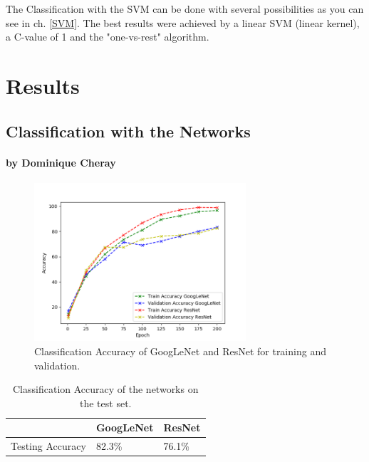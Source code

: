 \documentclass[11pt]{report}
\begin{document}
The Classification with the SVM can be done with several possibilities as you can see in ch. \ref{SVM}. The best results were achieved by a linear SVM (linear kernel), a C-value of 1 and the "one-vs-rest" algorithm. 


\chapter{Results}
\section{Classification with the Networks}
\subsubsection{by Dominique Cheray}

\begin{figure}
  \centering
  \includegraphics[width=0.7\textwidth]{AccuraciesGraph}
  \caption{Classification Accuracy of GoogLeNet and ResNet for training and
    validation.}
  \label{resultGraphNets}
\end{figure}

\begin{table}[]
  \centering
  \begin{tabular}{|l|l|l|}
    \hline
    & GoogLeNet & ResNet \\ \hline
    Testing Accuracy & 82.3\% & 76.1\% \\ \hline
  \end{tabular}
  \caption{Classification Accuracy of the networks on the test set.}
  \label{resultTableNets}
\end{table}
\end{document}
